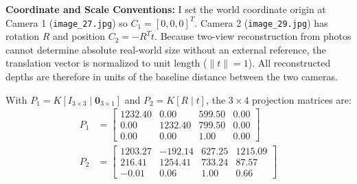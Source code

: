 \documentclass[12pt]{article}
\begin{document}
\noindent\textbf{Coordinate and Scale Conventions:} I set the world coordinate origin at Camera 1 (\texttt{image\_27.jpg}) so $C_1 = [0, 0, 0]^T$. Camera 2 (\texttt{image\_29.jpg}) has rotation $R$ and position $C_2 = -R^T t$. Because two-view reconstruction from photos cannot determine absolute real-world size without an external reference, the translation vector is normalized to unit length ($\|t\| = 1$). All reconstructed depths are therefore in units of the baseline distance between the two cameras.

With $P_1 = K [I_{3 \times 3} \mid \mathbf{0}_{3 \times 1}]$ and $P_2 = K [R \mid t]$, the $3 \times 4$ projection matrices are:
\begin{align}
P_1 &= \begin{bmatrix}
1232.40 & 0.00 & 599.50 & 0.00 \\
0.00 & 1232.40 & 799.50 & 0.00 \\
0.00 & 0.00 & 1.00 & 0.00
\end{bmatrix} \\
P_2 &= \begin{bmatrix}
1203.27 & -192.14 & 627.25 & 1215.09 \\
216.41 & 1254.41 & 733.24 & 87.57 \\
-0.01 & 0.06 & 1.00 & 0.66
\end{bmatrix}
\end{align}
\end{document}
